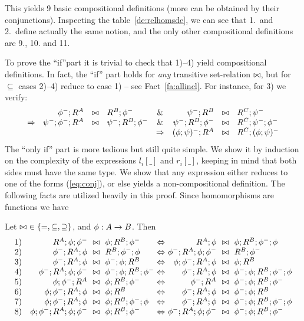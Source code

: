 \documentclass[10pt]{article}
\begin{document}
\noindent
This yields 9 basic compositional definitions (more can be obtained by
their conjunctions). Inspecting the table~\ref{de:relhomsde}, we can
see that 1.\ and 2.\ define actually the same notion, and the only other
compositional definitions are 9., 10. and 11.

To prove the ``if''part it is trivial to check that 1)--4) yield
compositional definitions. In fact, the ``if'' part holds for {\em
any} transitive set-relation $\bowtie$, but for $\subseteq$  cases 2)--4) 
 reduce to case 1) -- see Fact~\ref{fa:allincl}.
For instance, for 3) we verify:
\[ 
\begin{array}{rclcrcl} 
\phi^-;R^A &\any & R^B;\phi^- & 
         \& &  \psi^-;R^B & \any & R^C;\psi^- \\
\impl\ \ \psi^-;\phi^-;R^A & \any & \psi^-;R^B;\phi^- & 
         \& & \psi^-;R^B;\phi^- &\any &R^C;\psi^-;\phi^-   \\%
& & & \impl & (\phi;\psi)^-;R^A & \any & R^C;(\phi;\psi)^-
\end{array}
\]
The ``only if'' part is more tedious but still quite simple.
We show it by induction on the complexity of the
expressions $l_i[\_]$ and $r_i[\_]$, keeping in mind that both sides
must have the same type. We
show that any expression either reduces to one of the forms
(\ref{eq:conj}), or else yields a non-compositional
definition.
The following facts are utilized heavily in this proof.
Since homomorphisms are functions we have
%
\begin{Fact}
\label{fa:facts}
Let $\bowtie\ \in\{=,\subseteq,\supseteq\}$, and $\phi:A\rightarrow B$. Then
\[
\begin{array}{r@{)\ \ \ }r@{\ \ \any\ \ }l@{\ \Iff\ }r@{\ \ \any\ \ }l}
1 & R^A;\phi;\phi^- & \phi;R^B;\phi^- & R^A;\phi & \phi;R^B;\phi^-;\phi \\
2 & \phi^-;R^A;\phi & R^B;\phi^-;\phi &\phi^-;R^A;\phi;\phi^- & R^B;\phi^- \\
3 & \phi^-;R^A;\phi & \phi^-;\phi;R^B  & \phi;\phi^-;R^A;\phi &\phi;R^B \\
4 & \phi^-;R^A;\phi;\phi^-  & \phi^-;\phi;R^B;\phi^- &
        \phi^-;R^A;\phi & \phi^-;\phi;R^B;\phi^-;\phi \\
5 & \phi;\phi^-;R^A & \phi;R^B;\phi^- & 
        \phi^-;R^A & \phi^-;\phi;R^B;\phi^- \\
6 &\phi;\phi^-;R^A;\phi & \phi;R^B & 
        \phi^-;R^A;\phi & \phi^-;\phi;R^B \\
7 &\phi;\phi^-;R^A;\phi & \phi;R^B;\phi^-;\phi & 
        \phi^-;R^A;\phi & \phi^-;\phi;R^B;\phi^-;\phi \\
8 &\phi;\phi^-;R^A;\phi;\phi^- & \phi;R^B;\phi^- &
        \phi^-;R^A;\phi;\phi^- & \phi^-;\phi;R^B;\phi^-
\end{array}
\]
\end{Fact}
\end{document}
